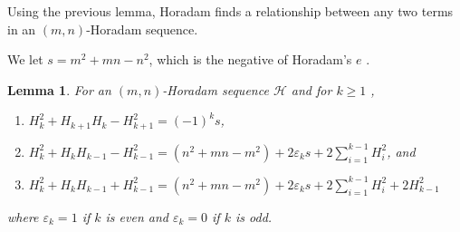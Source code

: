 \documentclass{amsart}
\newtheorem{lemma}{Lemma}
\newcommand{\ds}{\displaystyle}
\begin{document}
Using the previous lemma, Horadam \cite{Horadam1} finds a relationship between any two terms in an $(m,n)$-Horadam sequence.


We let $s = m^2+mn -n^2$, which is the negative of Horadam's $e$ \cite{Horadam1}.


\begin{lemma}\label{lem:sloperelations}
For an $(m,n)$-Horadam sequence $\mathcal H$ and for $k \ge 1$ , 
\begin{enumerate}
\item $H_{k}^2 +H_{k+1}H_{k} - H_{k+1}^2 = (-1)^{k}s$, 
\item $\ds H_{k}^2 +H_{k}H_{k-1} - H_{k-1}^2 = (n^2+mn -m^2) + 2\varepsilon_k s  + 2\sum_{i=1}^{k-1} H_i^2$, and
\item $\ds H_{k}^2 +H_{k}H_{k-1} + H_{k-1}^2 = (n^2+mn -m^2) + 2\varepsilon_k s  + 2\sum_{i=1}^{k-1} H_i^2 + 2H_{k-1}^2$
\end{enumerate}
where $\varepsilon_k = 1$ if $k$ is even and $\varepsilon_k = 0$ if $k$ is odd.

\end{lemma}
\end{document}
